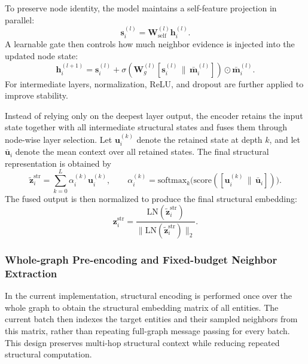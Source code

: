 To preserve node identity, the model maintains a self-feature projection in parallel:
\begin{equation}
\mathbf{s}_{i}^{(l)}=\mathbf{W}_{\mathrm{self}}^{(l)}\mathbf{h}_{i}^{(l)}.
\end{equation}
A learnable gate then controls how much neighbor evidence is injected into the updated node state:
\begin{equation}
\mathbf{h}_{i}^{(l+1)}
=
\mathbf{s}_{i}^{(l)}
+
\sigma
\left(
\mathbf{W}_{g}^{(l)}
[\mathbf{s}_{i}^{(l)} \,\|\, \bar{\mathbf{m}}_{i}^{(l)}]
\right)
\odot
\bar{\mathbf{m}}_{i}^{(l)}.
\end{equation}
For intermediate layers, normalization, ReLU, and dropout are further applied to improve stability.

Instead of relying only on the deepest layer output, the encoder retains the input state together with all intermediate structural states and fuses them through node-wise layer selection. Let $\mathbf{u}_i^{(k)}$ denote the retained state at depth $k$, and let $\bar{\mathbf{u}}_i$ denote the mean context over all retained states. The final structural representation is obtained by
\begin{equation}
\tilde{\mathbf{z}}_i^{\mathrm{str}}
=
\sum_{k=0}^{L}
\alpha_i^{(k)}\mathbf{u}_i^{(k)},
\qquad
\alpha_i^{(k)}
=
\mathrm{softmax}_{k}
\Big(
\mathrm{score}
(
[\mathbf{u}_i^{(k)} \,\|\, \bar{\mathbf{u}}_i]
)
\Big).
\end{equation}
The fused output is then normalized to produce the final structural embedding:
\begin{equation}
\mathbf{z}_i^{\mathrm{str}}
=
\frac{\mathrm{LN}(\tilde{\mathbf{z}}_i^{\mathrm{str}})}
{\|\mathrm{LN}(\tilde{\mathbf{z}}_i^{\mathrm{str}})\|_2}.
\end{equation}

\subsubsection{Whole-graph Pre-encoding and Fixed-budget Neighbor Extraction}

In the current implementation, structural encoding is performed once over the whole graph to obtain the structural embedding matrix of all entities. The current batch then indexes the target entities and their sampled neighbors from this matrix, rather than repeating full-graph message passing for every batch. This design preserves multi-hop structural context while reducing repeated structural computation.


